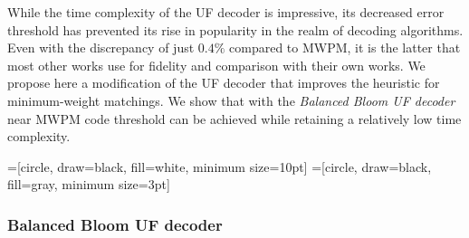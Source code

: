 \documentclass[11pt, a4paper, twoside, titlepage, usenames,dvipsnames]{report}
\begin{document}
While the time complexity of the UF decoder is impressive, its decreased error threshold has prevented its rise in popularity in the realm of decoding algorithms. Even with the discrepancy of just $0.4\%$ compared to MWPM, it is the latter that most other works use for fidelity and comparison with their own works. We propose here a modification of the UF decoder that improves the heuristic for minimum-weight matchings. We show that with the \emph{Balanced Bloom UF decoder} near MWPM code threshold can be achieved while retaining a relatively low time complexity. 


=[circle, draw=black, fill=white, minimum size=10pt] 
=[circle, draw=black, fill=gray, minimum size=3pt] 

\subsubsection{Balanced Bloom UF decoder}


\begin{figure}[h]
     \centering
     \begin{subfigure}[b]{0.45\textwidth}
         \centering
     \end{subfigure}
     \hfill
     \begin{subfigure}[b]{0.45\textwidth}
         \centering

     \end{subfigure}
\end{figure}
\end{document}
